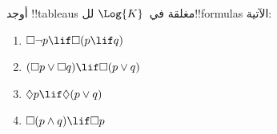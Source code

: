 \documentclass[../../../include/open-logic-section]{subfiles}
\begin{document}
\begin{prob}
  أوجد !!{tableau}s مغلقة في~$\Log{K}$ لل!!{formula}s الآتية:
  \begin{enumerate}
    \item $\Box \lnot p \lif \Box(p \lif q)$
    \item $(\Box p \lor \Box q) \lif \Box(p \lor q)$
    \item $\Diamond p \lif \Diamond(p \lor q)$
    \item $\Box(p \land q) \lif \Box p$
  \end{enumerate}
\end{prob}
\end{document}
